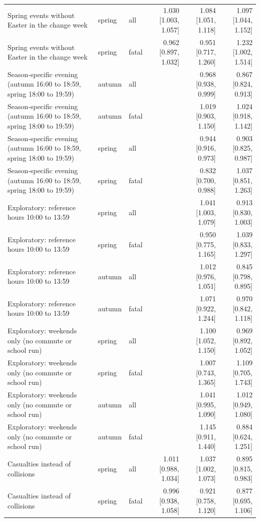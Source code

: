 \documentclass[11pt,a4paper]{article}
\begin{document}
{\begin{longtable}{p{5.6cm}llrrr}
Spring events without Easter in the change week & spring & all & 1.030 [1.003, 1.057] & 1.084 [1.051, 1.118] & 1.097 [1.044, 1.152]\\
Spring events without Easter in the change week & spring & fatal & 0.962 [0.897, 1.032] & 0.951 [0.717, 1.260] & 1.232 [1.002, 1.514]\\
Season-specific evening (autumn 16:00 to 18:59, spring 18:00 to 19:59) & autumn & all &  & 0.968 [0.938, 0.999] & 0.867 [0.824, 0.913]\\
Season-specific evening (autumn 16:00 to 18:59, spring 18:00 to 19:59) & autumn & fatal &  & 1.019 [0.903, 1.150] & 1.024 [0.918, 1.142]\\
Season-specific evening (autumn 16:00 to 18:59, spring 18:00 to 19:59) & spring & all &  & 0.944 [0.916, 0.973] & 0.903 [0.825, 0.987]\\
Season-specific evening (autumn 16:00 to 18:59, spring 18:00 to 19:59) & spring & fatal &  & 0.832 [0.700, 0.988] & 1.037 [0.851, 1.263]\\
Exploratory: reference hours 10:00 to 13:59 & spring & all &  & 1.041 [1.003, 1.079] & 0.913 [0.830, 1.003]\\
Exploratory: reference hours 10:00 to 13:59 & spring & fatal &  & 0.950 [0.775, 1.165] & 1.039 [0.833, 1.297]\\
Exploratory: reference hours 10:00 to 13:59 & autumn & all &  & 1.012 [0.976, 1.051] & 0.845 [0.798, 0.895]\\
Exploratory: reference hours 10:00 to 13:59 & autumn & fatal &  & 1.071 [0.922, 1.244] & 0.970 [0.842, 1.118]\\
Exploratory: weekends only (no commute or school run) & spring & all &  & 1.100 [1.052, 1.150] & 0.969 [0.892, 1.052]\\
Exploratory: weekends only (no commute or school run) & spring & fatal &  & 1.007 [0.743, 1.365] & 1.109 [0.705, 1.743]\\
Exploratory: weekends only (no commute or school run) & autumn & all &  & 1.041 [0.995, 1.090] & 1.012 [0.949, 1.080]\\
Exploratory: weekends only (no commute or school run) & autumn & fatal &  & 1.145 [0.911, 1.440] & 0.884 [0.624, 1.251]\\
Casualties instead of collisions & spring & all & 1.011 [0.988, 1.034] & 1.037 [1.002, 1.073] & 0.895 [0.815, 0.983]\\
Casualties instead of collisions & spring & fatal & 0.996 [0.938, 1.058] & 0.921 [0.758, 1.120] & 0.877 [0.695, 1.106]\\

\end{longtable}}
\end{document}
